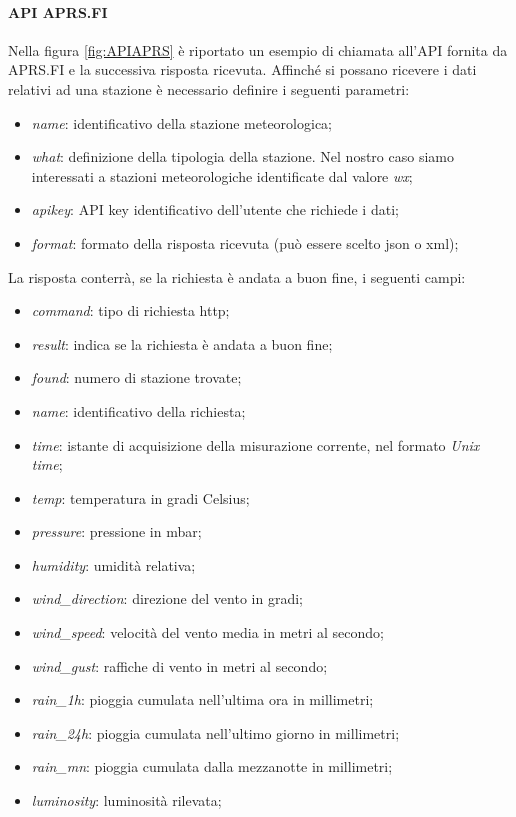 \paragraph{API APRS.FI}
Nella figura \Fig\ref{fig:APIAPRS} è riportato un esempio di chiamata all'API fornita da APRS.FI e la successiva risposta ricevuta.
Affinché si possano ricevere i dati relativi ad una stazione è necessario definire i seguenti parametri:
\begin{itemize}
	\item \textit{name}: identificativo della stazione meteorologica;
	\item \textit{what}: definizione della tipologia della stazione. Nel nostro caso siamo interessati a stazioni meteorologiche identificate dal valore \textit{wx};
	\item \textit{apikey}: API key identificativo dell'utente che richiede i dati;
	\item \textit{format}: formato della risposta ricevuta (può essere scelto json o xml);
\end{itemize}
La risposta conterrà, se la richiesta è andata a buon fine, i seguenti campi:
\begin{itemize}
	\item \textit{command}: tipo di richiesta http;
	\item \textit{result}: indica se la richiesta è andata a buon fine;
	\item \textit{found}: numero di stazione trovate;
	\item \textit{name}: identificativo della richiesta;
	\item \textit{time}: istante di acquisizione della misurazione corrente, nel formato \textit{Unix time};
	\item \textit{temp}: temperatura in gradi Celsius;
	\item \textit{pressure}: pressione in mbar;
	\item \textit{humidity}: umidità relativa;
	\item \textit{wind\_direction}: direzione del vento in gradi;
	\item \textit{wind\_speed}: velocità del vento media in metri al secondo;
	\item \textit{wind\_gust}: raffiche di vento in metri al secondo;
	\item \textit{rain\_1h}: pioggia cumulata nell'ultima ora in millimetri;
	\item \textit{rain\_24h}: pioggia cumulata nell'ultimo giorno in millimetri;
	\item \textit{rain\_mn}: pioggia cumulata dalla mezzanotte in millimetri;
	\item \textit{luminosity}: luminosità rilevata;
\end{itemize}

